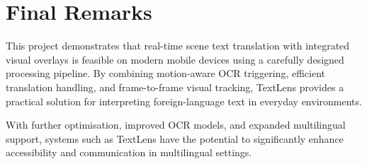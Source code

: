 \section{Final Remarks}

This project demonstrates that real-time scene text translation with integrated visual overlays is feasible on modern mobile devices using a carefully designed processing pipeline. By combining motion-aware OCR triggering, efficient translation handling, and frame-to-frame visual tracking, TextLens provides a practical solution for interpreting foreign-language text in everyday environments.

With further optimisation, improved OCR models, and expanded multilingual support, systems such as TextLens have the potential to significantly enhance accessibility and communication in multilingual settings.